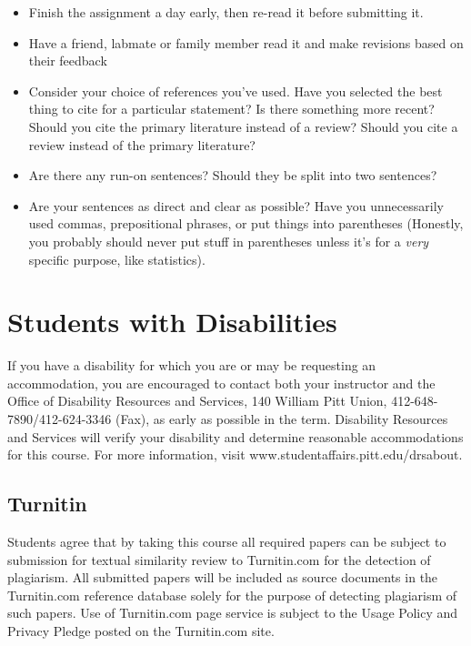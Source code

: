 \documentclass[
]{book}
\providecommand{\tightlist}{%
  \setlength{\itemsep}{0pt}\setlength{\parskip}{0pt}}
\begin{document}
\begin{itemize}
\tightlist
\item
  Finish the assignment a day early, then re-read it before submitting it.
\item
  Have a friend, labmate or family member read it and make revisions based on their feedback
\item
  Consider your choice of references you've used. Have you selected the best thing to cite for a particular statement? Is there something more recent? Should you cite the primary literature instead of a review? Should you cite a review instead of the primary literature?
\item
  Are there any run-on sentences? Should they be split into two sentences?
\item
  Are your sentences as direct and clear as possible? Have you unnecessarily used commas, prepositional phrases, or put things into parentheses (Honestly, you probably should never put stuff in parentheses unless it's for a \emph{very} specific purpose, like statistics).
\end{itemize}

\hypertarget{students-with-disabilities}{%
\chapter{Students with Disabilities}\label{students-with-disabilities}}

If you have a disability for which you are or may be requesting an accommodation, you are encouraged to contact both your instructor and the Office of Disability Resources and Services, 140 William Pitt Union, 412-648-7890/412-624-3346 (Fax), as early as possible in the term. Disability Resources and Services will verify your disability and determine reasonable accommodations for this course. For more information, visit www.studentaffairs.pitt.edu/drsabout.

\hypertarget{turnitin}{%
\section{Turnitin}\label{turnitin}}

Students agree that by taking this course all required papers can be subject to submission for textual similarity review to Turnitin.com for the detection of plagiarism. All submitted papers will be included as source documents in the Turnitin.com reference database solely for the purpose of detecting plagiarism of such papers. Use of Turnitin.com page service is subject to the Usage Policy and Privacy Pledge posted on the Turnitin.com site.
\end{document}

